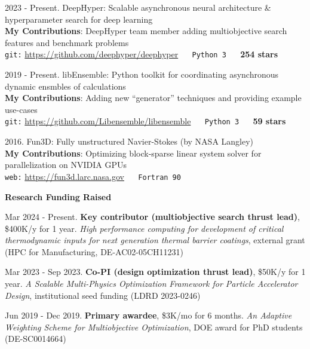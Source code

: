 \documentclass[alternative,compact,blue]{/Users/tyler/Git/thchang-style/styles/lualatex/yaac-another-awesome-cv}
\begin{document}
\begin{etaremune}
\item 2023 - Present. DeepHyper: Scalable asynchronous neural architecture \& hyperparameter search for deep learning\\
{\bf My Contributions}: DeepHyper team member adding multiobjective search features and benchmark problems\\
{\tt git:} \url{https://github.com/deephyper/deephyper} $\quad$ {\tt Python 3} $\quad$ {\bf 254 stars}
\item 2019 - Present. libEnsemble: Python toolkit for coordinating asynchronous dynamic ensmbles of calculations\\
{\bf My Contributions}: Adding new ``generator'' techniques and providing example use-cases\\
{\tt git:} \url{https://github.com/Libensemble/libensemble} $\quad$ {\tt Python 3} $\quad$ {\bf 59 stars}
\item 2016. Fun3D: Fully unstructured Navier-Stokes (by NASA Langley)\\
{\bf My Contributions}: Optimizing block-sparse linear system solver for parallelization on NVIDIA GPUs\\
{\tt web:} \url{https://fun3d.larc.nasa.gov} $\quad$ {\tt Fortran 90}
\end{etaremune}

\goodbreak

\bigskip


\nopagebreak \bigskip \nopagebreak

\textbf{\large Research Funding Raised}

\nopagebreak \medskip \nopagebreak

\begin{etaremune}
\item Mar 2024 - Present. {\bf Key contributor (multiobjective search thrust lead)}, \$400K/y for 1 year. {\sl High performance computing for development of critical thermodynamic inputs for next generation thermal barrier coatings}, external grant (HPC for Manufacturing, DE-AC02-05CH11231)
\item Mar 2023 - Sep 2023. {\bf Co-PI (design optimization thrust lead)}, \$50K/y for 1 year. {\sl A Scalable Multi-Physics Optimization Framework for Particle Accelerator Design}, institutional seed funding (LDRD 2023-0246)
\item Jun 2019 - Dec 2019. {\bf Primary awardee}, \$3K/mo for 6 months. {\sl An Adaptive Weighting Scheme for Multiobjective Optimization}, DOE award for PhD students (DE-SC0014664)
\end{etaremune}
\end{document}

